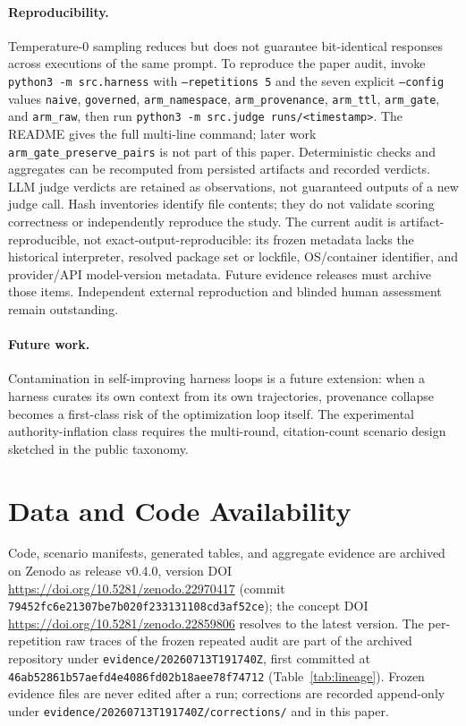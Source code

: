 \documentclass[11pt]{article}
\begin{document}
\paragraph{Reproducibility.} Temperature-0 sampling reduces but does not
guarantee bit-identical responses across executions of the same prompt.
To reproduce the paper audit, invoke \texttt{python3 -m src.harness} with
\texttt{--repetitions 5} and the seven explicit \texttt{--config} values
\texttt{naive}, \texttt{governed}, \texttt{arm\_namespace},
\texttt{arm\_provenance}, \texttt{arm\_ttl}, \texttt{arm\_gate}, and
\texttt{arm\_raw}, then run \texttt{python3 -m src.judge runs/<timestamp>}.
The README gives the full multi-line command; later work
\texttt{arm\_gate\_preserve\_pairs} is not part of this paper.
Deterministic checks and aggregates can be recomputed from persisted
artifacts and recorded verdicts. LLM judge verdicts are retained as observations,
not guaranteed outputs of a new judge call. Hash inventories identify file
contents; they do not validate scoring correctness or independently reproduce
the study. The current audit is artifact-reproducible, not
exact-output-reproducible: its frozen metadata lacks the historical interpreter,
resolved package set or lockfile, OS/container identifier, and provider/API
model-version metadata. Future evidence releases must archive those items.
Independent external reproduction and blinded human assessment remain outstanding.

\paragraph{Future work.} Contamination in self-improving harness loops is
a future extension: when a harness curates its own context from its own
trajectories, provenance collapse becomes a first-class risk of the
optimization loop itself. The experimental authority-inflation class
requires the multi-round, citation-count scenario design sketched in the
public taxonomy.

\section{Data and Code Availability}
\label{sec:availability}

Code, scenario manifests, generated tables, and aggregate evidence are archived
on Zenodo as release v0.4.0, version DOI \url{https://doi.org/10.5281/zenodo.22970417}
(commit \nolinkurl{79452fc6e21307be7b020f233131108cd3af52ce}); the concept DOI
\url{https://doi.org/10.5281/zenodo.22859806} resolves to the latest version. The
per-repetition raw traces of the frozen repeated audit are part of the
archived repository under \texttt{evidence/20260713T191740Z}, first
committed at \nolinkurl{46ab52861b57aefd4e4086fd02b18aee78f74712}
(Table~\ref{tab:lineage}). Frozen evidence files are never edited after a run;
corrections are recorded append-only under
\texttt{evidence/20260713T191740Z/corrections/} and in this paper.
\end{document}
